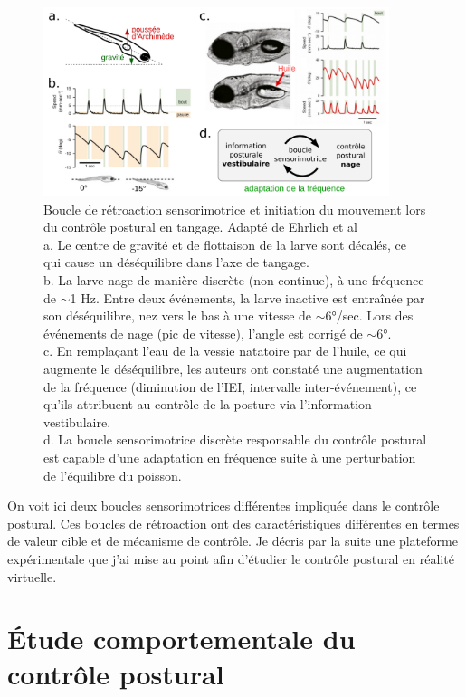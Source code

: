 \begin{figure}
\centering
\includegraphics[width=0.9\textwidth]{./files/schoppik_movement-initiation.svg.png}
\caption{Boucle de rétroaction sensorimotrice et initiation du mouvement lors du contrôle postural en tangage. Adapté de Ehrlich et al \cite{ehrlich_control_2017}
\\ a. Le centre de gravité et de flottaison de la larve sont décalés, ce qui cause un déséquilibre dans l'axe de tangage.
\\ b. La larve nage de manière discrète (non continue), à une fréquence de $\sim$1 Hz. Entre deux événements, la larve inactive est entraînée par son déséquilibre, nez vers le bas à une vitesse de $\sim$6°/sec. Lors des événements de nage (pic de vitesse), l'angle est corrigé de $\sim$6°.
\\ c. En remplaçant l'eau de la vessie natatoire par de l'huile, ce qui augmente le déséquilibre, les auteurs ont constaté une augmentation de la fréquence (diminution de l'IEI, intervalle inter-événement), ce qu'ils attribuent au contrôle de la posture via l'information vestibulaire.
\\ d. La boucle sensorimotrice discrète responsable du contrôle postural est capable d'une adaptation en fréquence suite à une perturbation de l'équilibre du poisson.
\label{FIGmovementinitiation}}
\end{figure}

On voit ici deux boucles sensorimotrices différentes impliquée dans le contrôle postural. Ces boucles de rétroaction ont des caractéristiques différentes en termes de valeur cible et de mécanisme de contrôle. Je décris par la suite une plateforme expérimentale que j'ai mise au point afin d'étudier le contrôle postural en réalité virtuelle.

\section{Étude comportementale du contrôle postural}

